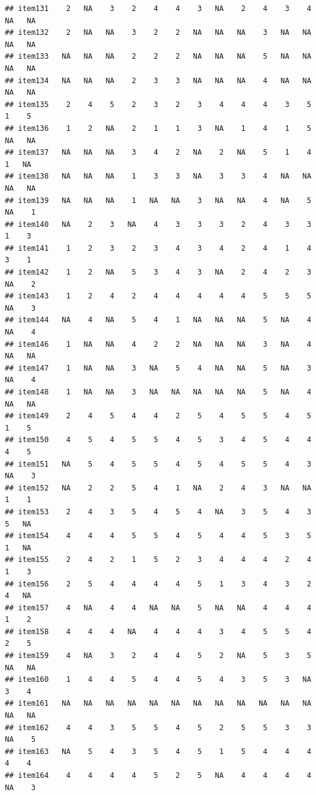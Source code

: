 \documentclass[
  man]{apa6}
\begin{document}
\begin{verbatim}
## item131    2   NA    3    2    4    4    3   NA    2    4    3    4   NA   NA
## item132    2   NA   NA    3    2    2   NA   NA   NA    3   NA   NA   NA   NA
## item133   NA   NA   NA    2    2    2   NA   NA   NA    5   NA   NA   NA   NA
## item134   NA   NA   NA    2    3    3   NA   NA   NA    4   NA   NA   NA   NA
## item135    2    4    5    2    3    2    3    4    4    4    3    5    1    5
## item136    1    2   NA    2    1    1    3   NA    1    4    1    5   NA   NA
## item137   NA   NA   NA    3    4    2   NA    2   NA    5    1    4    1   NA
## item138   NA   NA   NA    1    3    3   NA    3    3    4   NA   NA   NA   NA
## item139   NA   NA   NA    1   NA   NA    3   NA   NA    4   NA    5   NA    1
## item140   NA    2    3   NA    4    3    3    3    2    4    3    3    1    3
## item141    1    2    3    2    3    4    3    4    2    4    1    4    3    1
## item142    1    2   NA    5    3    4    3   NA    2    4    2    3   NA    2
## item143    1    2    4    2    4    4    4    4    4    5    5    5   NA    3
## item144   NA    4   NA    5    4    1   NA   NA   NA    5   NA    4   NA    4
## item146    1   NA   NA    4    2    2   NA   NA   NA    3   NA    4   NA   NA
## item147    1   NA   NA    3   NA    5    4   NA   NA    5   NA    3   NA    4
## item148    1   NA   NA    3   NA   NA   NA   NA   NA    5   NA    4   NA   NA
## item149    2    4    5    4    4    2    5    4    5    5    4    5    1    5
## item150    4    5    4    5    5    4    5    3    4    5    4    4    4    5
## item151   NA    5    4    5    5    4    5    4    5    5    4    3   NA    3
## item152   NA    2    2    5    4    1   NA    2    4    3   NA   NA    1    1
## item153    2    4    3    5    4    5    4   NA    3    5    4    3    5   NA
## item154    4    4    4    5    5    4    5    4    4    5    3    5    1   NA
## item155    2    4    2    1    5    2    3    4    4    4    2    4    1    3
## item156    2    5    4    4    4    4    5    1    3    4    3    2    4   NA
## item157    4   NA    4    4   NA   NA    5   NA   NA    4    4    4    1    2
## item158    4    4    4   NA    4    4    4    3    4    5    5    4    2    5
## item159    4   NA    3    2    4    4    5    2   NA    5    3    5   NA   NA
## item160    1    4    4    5    4    4    5    4    3    5    3   NA    3    4
## item161   NA   NA   NA   NA   NA   NA   NA   NA   NA   NA   NA   NA   NA   NA
## item162    4    4    3    5    5    4    5    2    5    5    3    3   NA    5
## item163   NA    5    4    3    5    4    5    1    5    4    4    4    4    4
## item164    4    4    4    4    5    2    5   NA    4    4    4    4   NA    3

\end{verbatim}
\end{document}

